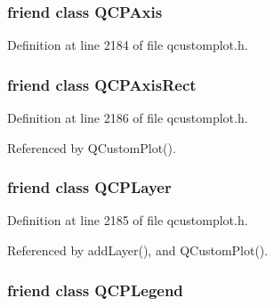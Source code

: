 \subsubsection[{Q\+C\+P\+Axis}]{\setlength{\rightskip}{0pt plus 5cm}friend class {\bf Q\+C\+P\+Axis}\hspace{0.3cm}{\ttfamily [friend]}}\label{class_q_custom_plot_af123edeca169ec7a31958a1d714e1a8a}


Definition at line 2184 of file qcustomplot.\+h.

\hypertarget{class_q_custom_plot_acbf20ecb140f66c5fd1bc64ae0762990}{}
\subsubsection[{Q\+C\+P\+Axis\+Rect}]{\setlength{\rightskip}{0pt plus 5cm}friend class {\bf Q\+C\+P\+Axis\+Rect}\hspace{0.3cm}{\ttfamily [friend]}}\label{class_q_custom_plot_acbf20ecb140f66c5fd1bc64ae0762990}


Definition at line 2186 of file qcustomplot.\+h.



Referenced by Q\+Custom\+Plot().

\hypertarget{class_q_custom_plot_a5dbf96bf7664c1b6fce49063eeea6eef}{}
\subsubsection[{Q\+C\+P\+Layer}]{\setlength{\rightskip}{0pt plus 5cm}friend class {\bf Q\+C\+P\+Layer}\hspace{0.3cm}{\ttfamily [friend]}}\label{class_q_custom_plot_a5dbf96bf7664c1b6fce49063eeea6eef}


Definition at line 2185 of file qcustomplot.\+h.



Referenced by add\+Layer(), and Q\+Custom\+Plot().

\hypertarget{class_q_custom_plot_a8429035e7adfbd7f05805a6530ad5e3b}{}
\subsubsection[{Q\+C\+P\+Legend}]{\setlength{\rightskip}{0pt plus 5cm}friend class {\bf Q\+C\+P\+Legend}\hspace{0.3cm}{\ttfamily [friend]}}\label{class_q_custom_plot_a8429035e7adfbd7f05805a6530ad5e3b}


